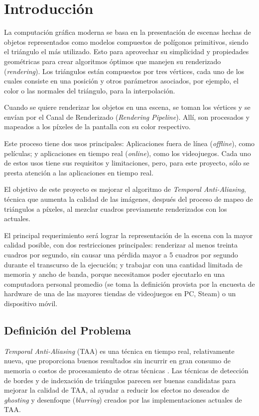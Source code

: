 \documentclass[pregrado]{tesis-usb} %
\begin{document}
\mainmatter

\chapter[Introducción]{Introducción}
La computación gráfica moderna se basa en la presentación de escenas hechas de objetos representados como modelos compuestos de polígonos primitivos, siendo el triángulo el más utilizado. Esto para aprovechar su simplicidad y propiedades geométricas para crear algoritmos óptimos que manejen su renderizado (\textit{rendering}). Los triángulos están compuestos por tres vértices, cada uno de los cuales consiste en una posición y otros parámetros asociados, por ejemplo, el color o las normales del triángulo, para la interpolación.

Cuando se quiere renderizar los objetos en una escena, se toman los vértices y se envían por el Canal de Renderizado (\textit{Rendering Pipeline}). Allí, son procesados y mapeados a los píxeles de la pantalla con su color respectivo.

Este proceso tiene dos usos principales: Aplicaciones fuera de línea (\textit{offline}), como películas; y aplicaciones en tiempo real (\textit{online}), como los videojuegos. Cada uno de estos usos tiene sus requisitos y limitaciones, pero, para este proyecto, sólo se presta atención a las aplicaciones en tiempo real.

El objetivo de este proyecto es mejorar el algoritmo de \textit{Temporal Anti-Aliasing}, técnica que aumenta la calidad de las imágenes, después del proceso de mapeo de triángulos a píxeles, al mezclar cuadros previamente renderizados con los actuales.

El principal requerimiento será lograr la representación de la escena con la mayor calidad posible, con dos restricciones principales: renderizar al menos treinta cuadros por segundo, sin causar una pérdida mayor a 5 cuadros por segundo durante el transcurso de la ejecución; y trabajar con una cantidad limitada de memoria y ancho de banda, porque necesitamos poder ejecutarlo en una computadora personal promedio (se toma la definición provista por la encuesta de hardware de una de las mayores tiendas de videojuegos en PC, Steam) \cite{valvecorporation2018} o un dispositivo móvil. \cite{Doggett2017EDAN35, Shreiner2011} 


\section{Definición del Problema}
\textit{Temporal Anti-Aliasing} (TAA) es una técnica en tiempo real, relativamente nueva, que proporciona buenos resultados sin incurrir en gran consumo de memoria o costos de procesamiento de otras técnicas \cite{Doggett2017EDAN35}. Las técnicas de detección de bordes y de indexación de triángulos parecen ser buenas candidatas para mejorar la calidad de TAA, al ayudar a reducir los efectos no deseados de \textit{ghosting} y desenfoque (\textit{blurring}) creados por las implementaciones actuales de TAA.
\end{document}
